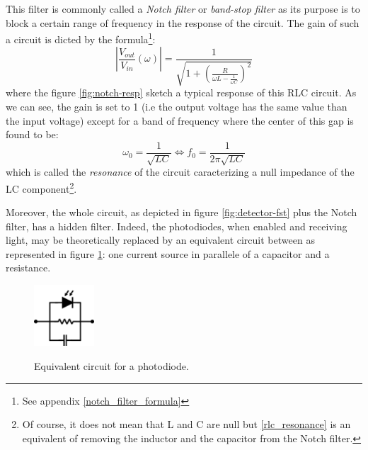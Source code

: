 \documentclass[10pt]{report}
\begin{document}
This filter is commonly called a \textit{Notch filter} or \textit{band-stop filter} as its purpose is to block a certain range of frequency in the response of the circuit. The gain of such a circuit is dicted by the formula\footnote{See appendix \ref{notch_filter_formula}}:
\begin{equation}
\left\lvert \frac{V_{out}}{V_{in}} (\omega) \right\rvert = \frac{1}{\sqrt{1 + \left(\frac{R}{\omega L - \frac{1}{\omega C}}\right)^2}}
\end{equation}
where the figure \ref{fig:notch-resp} sketch a typical response of this RLC circuit. As we can see, the gain is set to 1 (i.e the output voltage has the same value than the input voltage) except for a band of frequency where the center of this gap is found to be:
\begin{equation}
\label{rlc_resonance}
\omega_0 = \frac{1}{\sqrt{LC}} \Leftrightarrow f_0 = \frac{1}{2\pi\sqrt{LC}}
\end{equation}
which is called the \textit{resonance} of the circuit caracterizing a null impedance of the LC component\footnote{Of course, it does not mean that L and C are null but \eqref{rlc_resonance} is an equivalent of removing the inductor and the capacitor from the Notch filter.}.

Moreover, the whole circuit, as depicted in figure \ref{fig:detector-fst} plus the Notch filter, has a hidden filter. Indeed, the photodiodes, when enabled and receiving light, may be theoretically replaced by an equivalent circuit between as represented in figure \ref{fig:equiv-diode}: one current source in parallele of a capacitor and a resistance.

\begin{figure}[h!]
\caption{Equivalent circuit for a photodiode.}
\centering
\includegraphics[width=0.2\textwidth]{equiv-diode}
\label{fig:equiv-diode}
\end{figure}
\end{document}
